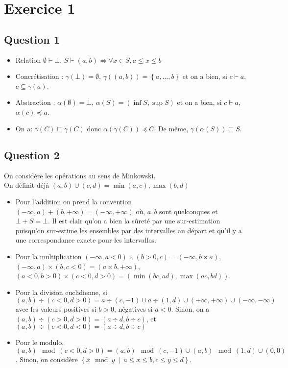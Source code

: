 \documentclass{cours}
\begin{document}
\section{Exercice 1}
\subsection{Question 1}
\begin{itemize}
    \item Relation $\emptyset \vdash \bot$, $S\vdash (a, b) \Leftrightarrow \forall x \in S, a\leq x \leq b$
    \item Concrétisation : $\gamma(\bot) = \emptyset$, $\gamma((a, b)) = \left\{a, \ldots, b\right\}$ et on a bien, si $c \vdash a$, $c\subseteq \gamma(a)$.
    \item Abstraction : $\alpha(\emptyset) = \bot$, $\alpha(S) = (\inf S, \sup S)$ et on a bien, si $c \vdash a$, $\alpha(c) \preceq a$.
    \item On a: $\gamma(C) \sqsubseteq \gamma(C)$ donc $\alpha(\gamma(C)) \preceq C$. De même, $\gamma(\alpha(S)) \sqsubseteq S$.
\end{itemize}

\subsection{Question 2}
On considère les opérations au sens de Minkowski. \\
On définit déjà $(a, b) \cup (c, d) = \min (a, c), \max(b, d)$
\begin{itemize}
    \item Pour l'addition on prend la convention $(-\infty, a) + (b, +\infty) = (-\infty, +\infty)$ où, $a, b$ sont quelconques et $\bot + S = \bot$. Il est clair qu'on a bien la sûreté par une sur-estimation puisqu'on sur-estime les ensembles par des intervalles au départ et qu'il y a une correspondance exacte pour les intervalles.
    \item Pour la multiplication $(-\infty, a < 0) \times (b > 0, c) = (-\infty, b \times a)$, $(-\infty, a) \times (b, c < 0) = (a\times b, +\infty)$, $(a < 0, b > 0) \times (c < 0, d > 0) = (\min(bc, ad), \max(ac, bd))$.
    \item Pour la division euclidienne, si $(a, b) \div (c < 0, d > 0) = a \div (c, -1) \cup a \div (1, d) \cup (+\infty, +\infty) \cup (-\infty, -\infty)$ avec les valeurs positives si $b > 0$, négatives si $a < 0$. Sinon, on a $(a, b) \div (c > 0, d > 0) = (a\div d, b \div c)$, et $(a, b) \div (c < 0, d < 0) = (a\div d, b \div c)$ 
    \item Pour le modulo, $(a, b) \mod (c < 0, d > 0) = (a, b) \mod (c, - 1) \cup (a, b) \mod (1, d) \cup (0, 0)$. Sinon, on considère $\left\{x \mod y\ \middle|\ a \leq x \leq b, c \leq y \leq d\right\}$.
\end{itemize}
\end{document}
